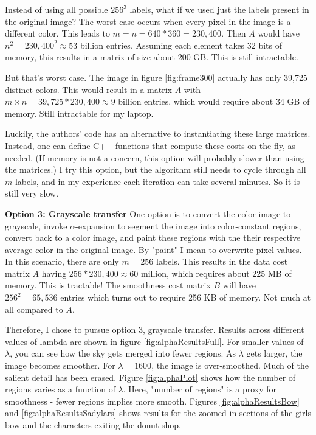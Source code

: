 \documentclass[10pt,twocolumn,letterpaper]{article}
\begin{document}
Instead of using all possible $256^3$ labels, what if we used just the labels present in the original image? The worst case occurs when every pixel in the image is a different color. This leads to $m = n = 640*360 = 230,400$. Then $A$ would have $n^2 = 230,400^2 \approx 53$ billion entries. Assuming each element takes 32 bits of memory, this results in a matrix of size about 200 GB. This is still intractable.

But that's worst case. The image in figure \ref{fig:frame300} actually has only 39,725 distinct colors. This would result in a matrix $A$ with $m \times n = 39,725 * 230,400 \approx 9$ billion entries, which would require about 34 GB of memory. Still intractable for my laptop.

Luckily, the authors'  code has an alternative to instantiating these large matrices. Instead, one can define C++ functions that compute these costs on the fly, as needed. (If memory is not a concern, this option will probably slower than using the matrices.) I try this option, but the algorithm still needs to cycle through all $m$ labels, and in my experience each iteration can take several minutes. So it is still very slow.

{\bf Option 3: Grayscale transfer } One option is to convert the color image to grayscale, invoke $\alpha$-expansion to segment the image into color-constant regions, convert back to a color image, and paint these regions with the their respective average color in the original image. By "paint" I mean to overwrite pixel values. In this scenario, there are only $m = 256$ labels. This results in the data cost matrix $A$ having $256 * 230,400 \approx 60$ million, which requires about 225 MB of memory. This is tractable! The smoothness cost matrix $B$ will have $256^2 = 65,536$ entries which turns out to require 256 KB of memory. Not much at all compared to $A$.

Therefore, I chose to pursue option 3, grayscale transfer. Results across different values of lambda are shown in figure \ref{fig:alphaResultsFull}. For smaller values of $\lambda$, you can see how the sky gets merged into fewer regions. As $\lambda$ gets larger, the image becomes smoother. For $\lambda = 1600$, the image is over-smoothed. Much of the salient detail has been erased. Figure \ref{fig:alphaPlot} shows how the number of regions varies as a function of $\lambda$. Here, "number of regions" is a proxy for smoothness - fewer regions implies more smooth. Figures \ref{fig:alphaResultsBow} and \ref{fig:alphaResultsSadylars} shows results for the zoomed-in sections of the girls bow and the characters exiting the donut shop.
\end{document}
